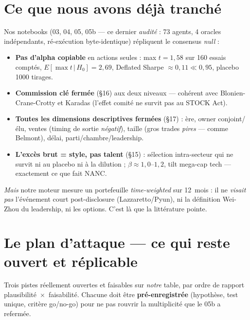 \documentclass[11pt,a4paper]{article}
\begin{document}
\section{Ce que nous avons déjà tranché}

Nos notebooks (03, 04, 05, 05b --- ce dernier \emph{audité} : 73 agents, 4 oracles indépendants,
ré-exécution byte-identique) répliquent le consensus \emph{null} :
\begin{itemize}
  \item \textbf{Pas d'alpha copiable} en actions seules : max $t = 1{,}58$ sur 160 essais comptés,
  $E[\max t \,|\, H_0] = 2{,}69$, Deflated Sharpe $\approx 0{,}11 \ll 0{,}95$, placebo 1000 tirages.
  \item \textbf{Commission clé fermée} (§16) aux deux niveaux --- cohérent avec Blonien-Crane-Crotty et Karadas
  (l'effet comité ne survit pas au STOCK Act).
  \item \textbf{Toutes les dimensions descriptives fermées} (§17) : ère, owner conjoint/élu, ventes (timing
  de sortie \emph{négatif}), taille (gros trades \emph{pires} --- comme Belmont), délai, parti/chambre/leadership.
  \item \textbf{L'excès brut = style, pas talent} (§15) : sélection intra-secteur qui ne survit ni au placebo
  ni à la dilution ; $\beta \approx 1{,}0$--$1{,}2$, tilt mega-cap tech --- exactement ce que fait NANC.
\end{itemize}
\emph{Mais} notre moteur mesure un portefeuille \emph{time-weighted} sur 12~mois : il ne \emph{visait pas}
l'événement court post-disclosure (Lazzaretto/Pyun), ni la définition Wei-Zhou du leadership, ni les options.
C'est là que la littérature pointe.

\section{Le plan d'attaque --- ce qui reste ouvert et réplicable}\label{sec:plan}

Trois pistes réellement ouvertes et faisables sur \emph{notre} table, par ordre de rapport
plausibilité~$\times$~faisabilité. Chacune doit être \textbf{pré-enregistrée} (hypothèse, test unique,
critère go/no-go) pour ne pas rouvrir la multiplicité que le 05b a refermée.
\end{document}
